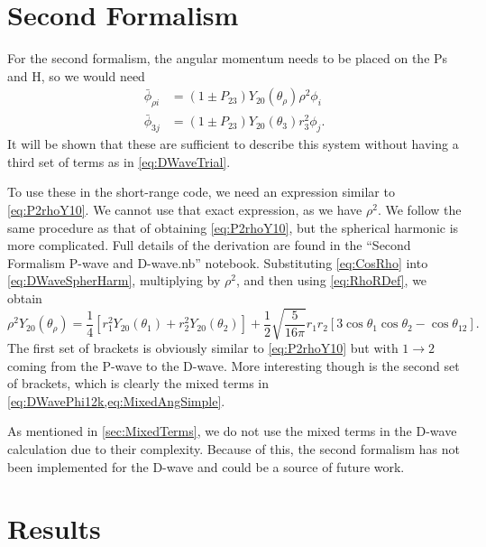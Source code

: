 \documentclass[Dissertation.tex]{subfiles}
\begin{document}
\section{Second Formalism}
\label{sec:DSecondForm}
For the second formalism, the angular momentum needs to be placed on the Ps and
H, so we would need
\begin{subequations}
\label{eq:DWave2ndPhiBar}
\begin{align}
\bar{\phi}_{\rho i} &= \left(1 \pm P_{23}\right) Y_{20}(\theta_\rho) \rho^2 \phi_i \label{eq:DWave2ndPhi1i}\\
\bar{\phi}_{3j} &= \left(1 \pm P_{23}\right) Y_{20}(\theta_3) r_3^2 \phi_j \label{eq:DWave2ndPhi2j}.
\end{align}
\end{subequations}
It will be shown that these are sufficient to describe this system without 
having a third set of terms as in \cref{eq:DWaveTrial}.

To use these in the short-range code, we need an expression similar to
\cref{eq:P2rhoY10}. We cannot use that exact expression, as we have $\rho^2$. We
follow the same procedure as that of obtaining \cref{eq:P2rhoY10}, but the
spherical harmonic is more complicated. Full details of the derivation are
found in the ``Second Formalism P-wave and D-wave.nb'' notebook.
Substituting \cref{eq:CosRho} into \cref{eq:DWaveSpherHarm}, multiplying by
$\rho^2$, and then using \cref{eq:RhoRDef}, we obtain
\begin{equation}
\label{eq:rhoident2}
\rho^2 Y_{20}(\theta_\rho) = \frac{1}{4} \left[r_1^2 Y_{20}(\theta_1) + r_2^2 Y_{20}(\theta_2) \right] + \frac{1}{2} \sqrt{\frac{5}{16 \pi}} 
   r_1 r_2 \left[3 \cos\theta_1 \cos\theta_2 - \cos\theta_{12} \right].
\end{equation}
The first set of brackets is obviously similar to \cref{eq:P2rhoY10} but with
$1 \to 2$ coming from the P-wave to the D-wave. More interesting though is the
second set of brackets, which is clearly the mixed terms in
\cref{eq:DWavePhi12k,eq:MixedAngSimple}.

As mentioned in \cref{sec:MixedTerms}, we do not use the mixed terms in the
D-wave calculation due to their complexity. Because of this, the second
formalism has not been implemented for the D-wave and could be a source of
future work.




\section{Results}
\label{sec:DWaveResults}
\end{document}
